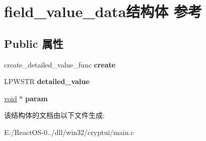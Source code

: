 \hypertarget{structfield__value__data}{}\section{field\+\_\+value\+\_\+data结构体 参考}
\label{structfield__value__data}
\subsection*{Public 属性}
\begin{DoxyCompactItemize}
\item 
\mbox{\label{structfield__value__data_a6def571eea3644c8af2761f2a0983074}} 
create\+\_\+detailed\+\_\+value\+\_\+func {\bfseries create}
\item 
\mbox{\label{structfield__value__data_a12205db3d56b8bc9acb8316cc79a53b0}} 
L\+P\+W\+S\+TR {\bfseries detailed\+\_\+value}
\item 
\mbox{\label{structfield__value__data_a09cff129cf2dd0aba2759c584fa7fc74}} 
\hyperlink{interfacevoid}{void} $\ast$ {\bfseries param}
\end{DoxyCompactItemize}


该结构体的文档由以下文件生成\+:\begin{DoxyCompactItemize}
\item 
E\+:/\+React\+O\+S-\/0../dll/win32/cryptui/main.\+c\end{DoxyCompactItemize}
